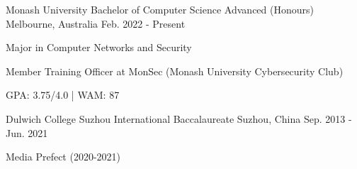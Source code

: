 

\begin{cventries}


    \cventry
    {Monash University}
    {Bachelor of Computer Science Advanced (Honours)}
    {Melbourne, Australia}
    {Feb. 2022 - Present}
    {
        \begin{cvitems}
            \item {Major in Computer Networks and Security}
            \item {Member Training Officer at MonSec (Monash University Cybersecurity Club)}
            \item {GPA: 3.75/4.0 | WAM: 87}
        \end{cvitems}
    }


  \cventry
    {Dulwich College Suzhou} %
    {International Baccalaureate} %
    {Suzhou, China} %
    {Sep. 2013 - Jun. 2021} %
    {
      \begin{cvitems} %
        \item {Media Prefect (2020-2021)}
      \end{cvitems}
    }

\end{cventries}
